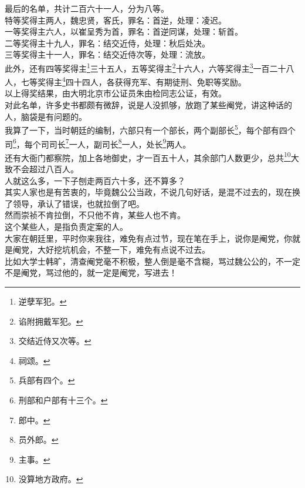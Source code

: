 \begin{multicols}{\theparacolNo}
最后的名单，共计二百六十一人，分为八等。\\

特等奖得主两人，魏忠贤，客氏，罪名：首逆，处理：凌迟。\\

一等奖得主六人，以崔呈秀为首，罪名：首逆同谋，处理：斩首。\\

二等奖得主十九人，罪名：结交近侍，处理：秋后处决。\\

三等奖得主十一人，罪名：结交近侍次等，处理：流放。\\

此外，还有四等奖得主\footnote{逆孽军犯。}三十五人，五等奖得主\footnote{谄附拥戴军犯。}十六人，六等奖得主\footnote{交结近侍又次等。}一百二十八人，七等奖得主\footnote{祠颂。}四十四人，各获得充军、有期徒刑、免职等奖励。\\

以上得奖结果，由大明北京市公证员朱由检同志公证，有效。\\

对此名单，许多史书都颇有微辞，说是人没抓够，放跑了某些阉党，讲这种话的人，脑袋是有问题的。\\

我算了一下，当时朝廷的编制，六部只有一个部长，两个副部长\footnote{兵部有四个。}，每个部有四个司\footnote{刑部和户部有十三个。}，每个司司长\footnote{郎中。}一人，副司长\footnote{员外郎。}一人，处长\footnote{主事。}两人。\\

还有大衙门都察院，加上各地御史，才一百五十人，其余部门人数更少，总共\footnote{没算地方政府。}大致不会超过八百人。\\

人就这么多，一下子刨走两百六十多，还不算多？\\

其实人家也是有苦衷的，毕竟魏公公当政，不说几句好话，是混不过去的，现在换了领导，承认了错误，也就拉倒了吧。\\

然而崇祯不肯拉倒，不只他不肯，某些人也不肯。\\

这个某些人，是指负责定案的人。\\

大家在朝廷里，平时你来我往，难免有点过节，现在笔在手上，说你是阉党，你就是阉党，大好挖坑机会，不整一下，难免有点说不过去。\\

比如大学士韩旷，清查阉党毫不积极，整人倒是毫不含糊，骂过魏公公的，不一定不是阉党，骂过他的，就一定是阉党，写进去！\\


\end{multicols}
